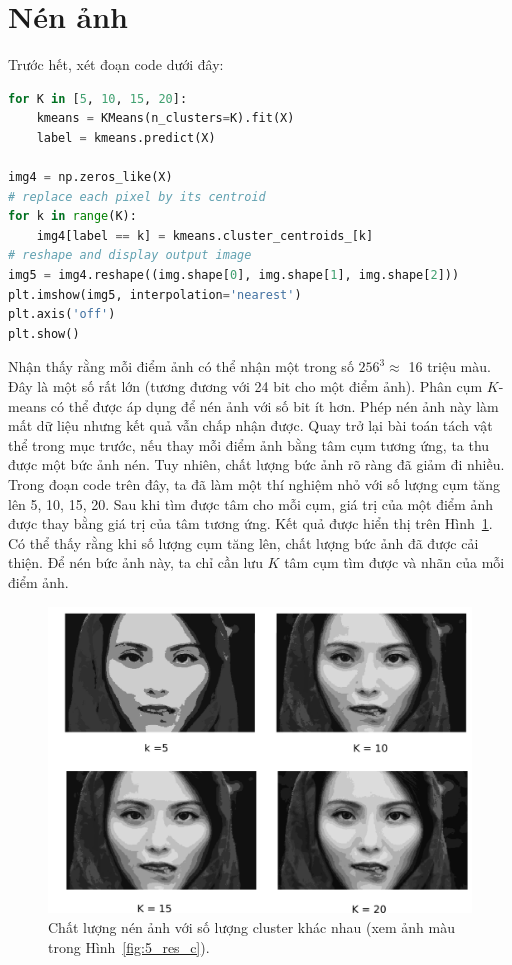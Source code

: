 \section{Nén ảnh}

Trước hết, xét đoạn code dưới đây:

\begin{lstlisting}[language=Python]
for K in [5, 10, 15, 20]:
    kmeans = KMeans(n_clusters=K).fit(X)
    label = kmeans.predict(X)

img4 = np.zeros_like(X)
# replace each pixel by its centroid
for k in range(K):
    img4[label == k] = kmeans.cluster_centroids_[k]
# reshape and display output image
img5 = img4.reshape((img.shape[0], img.shape[1], img.shape[2]))
plt.imshow(img5, interpolation='nearest')
plt.axis('off')
plt.show()
\end{lstlisting}

Nhận thấy rằng mỗi điểm ảnh có thể nhận một trong số $256^3 \approx $ 16 triệu
màu. Đây là một số rất lớn (tương đương với 24 bit cho một điểm ảnh). Phân cụm
$K$-means có thể được áp dụng để nén ảnh với số bit ít hơn. Phép nén ảnh này làm
mất dữ liệu nhưng kết quả vẫn chấp nhận được. Quay trở lại bài toán tách vật thể
trong mục trước, nếu thay mỗi điểm ảnh bằng tâm cụm tương ứng, ta thu được một
bức ảnh nén. Tuy nhiên, chất lượng bức ảnh rõ ràng đã giảm đi nhiều. Trong đoạn
code trên đây, ta đã làm một thí nghiệm nhỏ với số lượng cụm tăng lên 5, 10, 15,
20. Sau khi tìm được tâm cho mỗi cụm, giá trị của một điểm ảnh được thay bằng
giá trị của tâm tương ứng. Kết quả được hiển thị trên Hình~\ref{fig:5_res}. Có
thể thấy rằng khi số lượng cụm tăng lên, chất lượng bức ảnh đã được cải thiện.
Để nén bức ảnh này, ta chỉ cần lưu $K$ tâm cụm tìm được và nhãn của mỗi điểm
ảnh.



\begin{figure}[t]
\centering
\includegraphics[width = \textwidth]{Chapters/03_SimpleML/4_kmeans/girl_all_gray.png}
\caption[]{Chất lượng nén ảnh với số lượng cluster khác nhau (xem ảnh màu trong Hình~\ref{fig:5_res_c}).}
\label{fig:5_res}
\end{figure}


